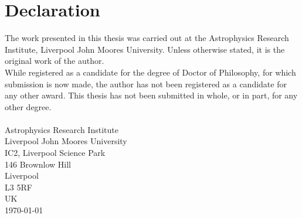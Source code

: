\chapter*{Declaration}
The work presented in this thesis was carried out at the Astrophysics Research Institute, Liverpool John Moores University. 
Unless otherwise stated, it is the original work of the author.\\
While registered as a candidate for the degree of Doctor of Philosophy, for which submission is now made, the author has not been registered as a candidate for any other award. 
This thesis has not been submitted in whole, or in part, for any other degree.\\


\vfill
\AuthorName\\
Astrophysics Research Institute\\
Liverpool John Moores University\\
IC2, Liverpool Science Park\\
146 Brownlow Hill\\
Liverpool\\
L3 5RF\\
UK\\
\vfill
{\sc \hfill\today}